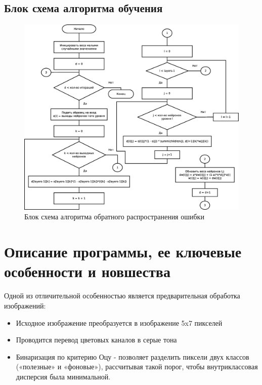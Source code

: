 \documentclass[russian,utf8,emptystyle]{eskdtext}
\begin{document}
\subsection{Блок схема алгоритма обучения}
\begin{figure}[h!]
\includegraphics[width=1\textwidth]{train-algorithm}
\caption{Блок схема алгоритма обратного распространения ошибки}
\end{figure}
\clearpage

\section{Описание программы, ее ключевые особенности и новшества}
Одной из отличительной особенностью является предварительная обработка изображений:
\begin{itemize}
\item Исходное изображение преобразуется в изображение 5x7 пикселей
\item Проводится перевод цветовых каналов в серые тона
\item Бинаризация по критерию Оцу - позволяет разделить пиксели двух классов («полезные» и «фоновые»), рассчитывая такой порог, чтобы внутриклассовая дисперсия была минимальной.
\end{itemize}
\end{document}

